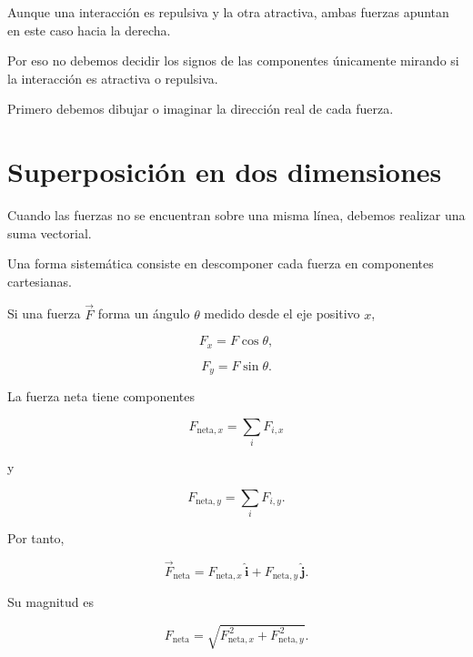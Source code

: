 \begin{interpretacion}

Aunque una interacción es repulsiva y la otra atractiva, ambas fuerzas
apuntan en este caso hacia la derecha.

Por eso no debemos decidir los signos de las componentes únicamente mirando
si la interacción es atractiva o repulsiva.

Primero debemos dibujar o imaginar la dirección real de cada fuerza.

\end{interpretacion}



\section{Superposición en dos dimensiones}

Cuando las fuerzas no se encuentran sobre una misma línea, debemos realizar
una suma vectorial.

Una forma sistemática consiste en descomponer cada fuerza en componentes
cartesianas.

Si una fuerza \(\vec{F}\) forma un ángulo \(\theta\) medido desde el eje
positivo \(x\),

\[
F_x
=
F\cos\theta,
\]

\[
F_y
=
F\sin\theta.
\]

La fuerza neta tiene componentes

\begin{equation}
    \boxed{
    F_{\text{neta},x}
    =
    \sum_i F_{i,x}
    }
\end{equation}

y

\begin{equation}
    \boxed{
    F_{\text{neta},y}
    =
    \sum_i F_{i,y}
    }.
\end{equation}

Por tanto,

\begin{equation}
    \boxed{
    \vec{F}_{\text{neta}}
    =
    F_{\text{neta},x}\,\hat{\mathbf{i}}
    +
    F_{\text{neta},y}\,\hat{\mathbf{j}}
    }.
\end{equation}

Su magnitud es

\begin{equation}
    \boxed{
    F_{\text{neta}}
    =
    \sqrt{
    F_{\text{neta},x}^{\,2}
    +
    F_{\text{neta},y}^{\,2}
    }
    }.
    \label{eq:magnitud_fuerza_neta}
\end{equation}


